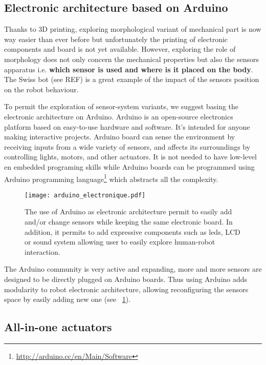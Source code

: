 \subsection{Electronic architecture based on Arduino} %

Thanks to 3D printing, exploring morphological variant of mechanical part is now way easier than ever before but unfortunately the printing of electronic components and board is not yet available. However, exploring the role of morphology does not only concern the mechanical properties but also the sensors apparatus i.e. \textbf{which sensor is used and where is it placed on the body}. The Swiss bot (see REF) is a great example of the impact of the sensors position on the robot behaviour.

To permit the exploration of sensor-system variants, we suggest basing the electronic architecture on Arduino. Arduino is an open-source electronics platform based on easy-to-use hardware and software. It's intended for anyone making interactive projects. Arduino board can sense the environment by receiving inputs from a wide variety of sensors, and affects its surroundings by controlling lights, motors, and other actuators. It is not needed to have low-level en embedded programing skills while Arduino boards can be programmed using Arduino programming language\footnote{\url{http://arduino.cc/en/Main/Software}} which abstracts all the complexity.

\begin{figure}[tb]
    \begin{center}
        \texttt{[image: arduino\_electronique.pdf]}
    \end{center}
    \caption{The use of Arduino as electronic architecture permit to easily add and/or change sensors while keeping the same electronic board. In addition, it permits to add expressive components such as leds, LCD or sound system allowing user to easily explore human-robot interaction.}
    \label{fig:arduino_modular_electronic}
\end{figure}


The Arduino community is very active and expanding, more and more sensors are designed to be directly plugged on Arduino boards. Thus using Arduino adds modularity to robot electronic architecture, allowing reconfiguring the sensors space by easily adding new one (see \figurename~\ref{fig:arduino_modular_electronic}).


\subsection{All-in-one actuators} %

